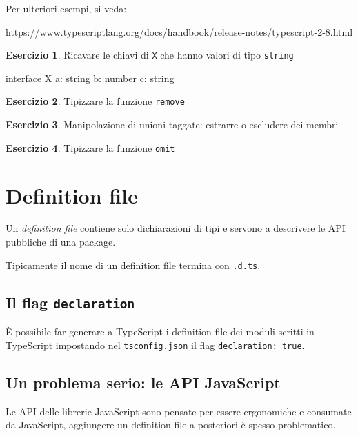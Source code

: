 \documentclass[12pt]{article}
\theoremstyle{definition}
\newtheorem{exercise}{Esercizio}[subsection]
\newenvironment{code}
  {\vspace{0.5cm} \VerbatimEnvironment\begin{typescriptcode}}
  {\end{typescriptcode} \vspace{0.2cm}}
\begin{document}
Per ulteriori esempi, si veda:

https://www.typescriptlang.org/docs/handbook/release-notes/typescript-2-8.html

\begin{exercise}
Ricavare le chiavi di \texttt{X} che hanno valori di tipo \texttt{string}

\begin{code}
interface X {
  a: string
  b: number
  c: string
}
\end{code}
\end{exercise}

\begin{exercise}
Tipizzare la funzione \texttt{remove}
\end{exercise}

\begin{exercise}
Manipolazione di unioni taggate: estrarre o escludere dei membri
\end{exercise}

\begin{exercise}
Tipizzare la funzione \texttt{omit}
\end{exercise}

\newpage
\section{Definition file}

Un \emph{definition file} contiene solo dichiarazioni di tipi e servono a descrivere le API pubbliche di una package.

Tipicamente il nome di un definition file termina con \texttt{.d.ts}.

\subsection{Il flag \texttt{declaration}}

È possibile far generare a TypeScript i definition file dei moduli scritti in TypeScript impostando nel \texttt{tsconfig.json}
il flag \texttt{declaration: true}.

\subsection{Un problema serio: le API JavaScript}

Le API delle librerie JavaScript sono pensate per essere ergonomiche e consumate da JavaScript,
aggiungere un definition file a posteriori è spesso problematico.
\end{document}
